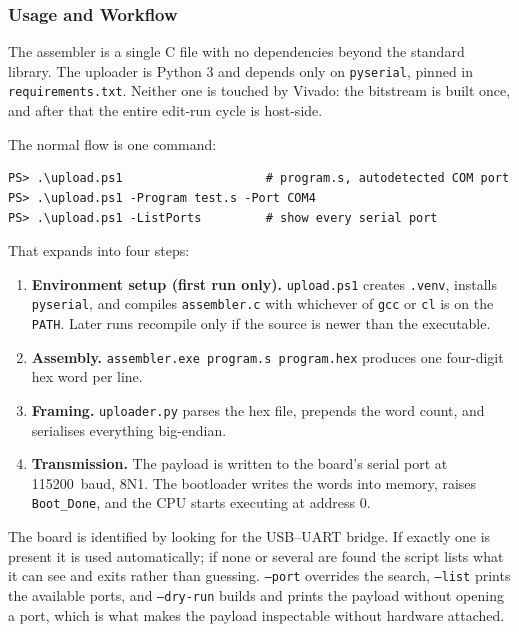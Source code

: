 \documentclass[11pt,letterpaper]{article}
\begin{document}
\subsubsection{Usage and Workflow}
The assembler is a single C file with no dependencies beyond the standard
library. The uploader is Python 3 and depends only on \texttt{pyserial}, pinned
in \texttt{requirements.txt}. Neither one is touched by Vivado: the bitstream is
built once, and after that the entire edit-run cycle is host-side.

The normal flow is one command:
\begin{lstlisting}[style=py,caption={Assembling and uploading a program.},numbers=none]
PS> .\upload.ps1                    # program.s, autodetected COM port
PS> .\upload.ps1 -Program test.s -Port COM4
PS> .\upload.ps1 -ListPorts         # show every serial port
\end{lstlisting}

\noindent That expands into four steps:

\begin{enumerate}
  \item \textbf{Environment setup (first run only).} \texttt{upload.ps1}
    creates \texttt{.venv}, installs \texttt{pyserial}, and compiles
    \texttt{assembler.c} with whichever of \texttt{gcc} or \texttt{cl} is on
    the \texttt{PATH}. Later runs recompile only if the source is newer than
    the executable.
  \item \textbf{Assembly.} \texttt{assembler.exe program.s program.hex}
    produces one four-digit hex word per line.
  \item \textbf{Framing.} \texttt{uploader.py} parses the hex file, prepends
    the word count, and serialises everything big-endian.
  \item \textbf{Transmission.} The payload is written to the board's serial
    port at 115200~baud, 8N1. The bootloader writes the words into memory,
    raises \texttt{Boot\_Done}, and the CPU starts executing at address 0.
\end{enumerate}

The board is identified by looking for the USB--UART bridge. If exactly one is present it is used automatically; if none
or several are found the script lists what it can see and exits rather than
guessing. \texttt{--port} overrides the search, \texttt{--list} prints the
available ports, and \texttt{--dry-run} builds and prints the payload without
opening a port, which is what makes the payload inspectable without hardware
attached.
\end{document}
